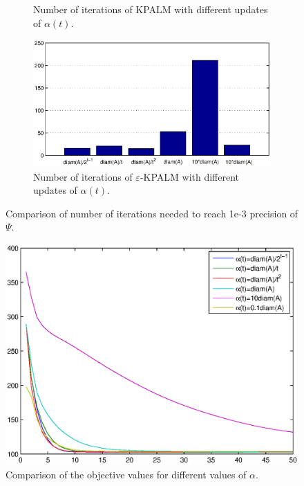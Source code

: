 \documentclass[11pt]{article}
\numberwithin{equation}{section}
\begin{document}
\begin{figure}[ht]
\begin{subfigure}[b]{0.8\textwidth}
        \caption{Number of iterations of KPALM with different updates of $\alpha(t)$.}
        \label{fig:iters_dyn_alpha_kpalm_comp}
    \end{subfigure}
    \begin{subfigure}[b]{0.8\textwidth}
        \includegraphics[width=\textwidth]{iterations_dynamic_alpha_eps_kpalm_comparison}
        \caption{Number of iterations of $\varepsilon$-KPALM with different updates of $\alpha(t)$.}
        \label{fig:iters_dyn_alpha_eps_kpalm_comp}
    \end{subfigure}
    \caption{Comparison of number of iterations needed to reach 1e-3 precision of $\Psi$.}\label{fig:iters_comp}
\end{figure}

\begin{figure}
    \centering
    \includegraphics[width=\textwidth]{dynamic_alpha_eps_kpalm}
    \caption{Comparison of the objective values for different values of $\alpha$.}
    \label{fig:dynamic_alpha_eps_psi_comp}
\end{figure} 
\end{document}
